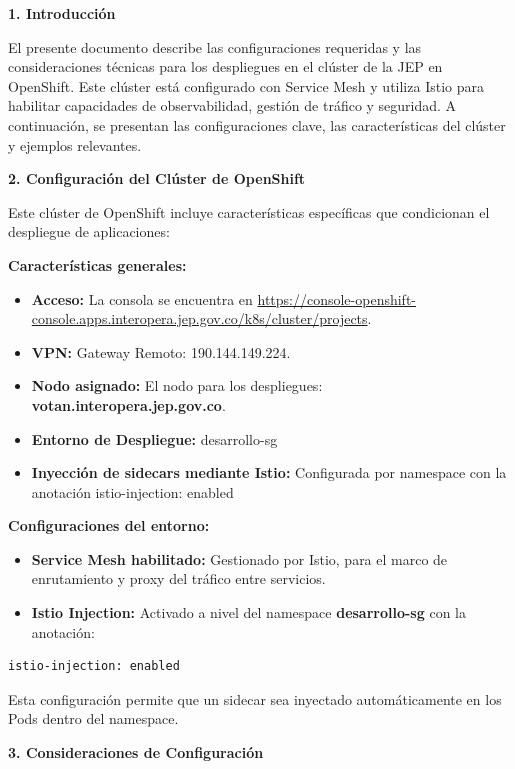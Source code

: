 \documentclass[
  paper=a4,
  ,captions=tableheading
]{scrartcl}
\providecommand{\tightlist}{%
  \setlength{\itemsep}{0pt}\setlength{\parskip}{0pt}}
\begin{document}
\textbf{1. Introducción}

El presente documento describe las configuraciones requeridas y las
consideraciones técnicas para los despliegues en el clúster de la JEP en
OpenShift. Este clúster está configurado con Service Mesh y utiliza
Istio para habilitar capacidades de observabilidad, gestión de tráfico y
seguridad. A continuación, se presentan las configuraciones clave, las
características del clúster y ejemplos relevantes.

\textbf{2. Configuración del Clúster de OpenShift}

Este clúster de OpenShift incluye características específicas que
condicionan el despliegue de aplicaciones:

\textbf{Características generales:}

\begin{itemize}
\tightlist
\item
  \textbf{Acceso:} La consola se encuentra en
  \url{https://console-openshift-console.apps.interopera.jep.gov.co/k8s/cluster/projects}.
\item
  \textbf{VPN:} Gateway Remoto: 190.144.149.224.
\item
  \textbf{Nodo asignado:} El nodo para los despliegues:
  \textbf{votan.interopera.jep.gov.co}.
\item
  \textbf{Entorno de Despliegue:} desarrollo-sg
\item
  \textbf{Inyección de sidecars mediante Istio:} Configurada por
  namespace con la anotación istio-injection: enabled
\end{itemize}

\textbf{Configuraciones del entorno:}

\begin{itemize}
\tightlist
\item
  \textbf{Service Mesh habilitado:} Gestionado por Istio, para el marco
  de enrutamiento y proxy del tráfico entre servicios.
\item
  \textbf{Istio Injection:} Activado a nivel del namespace
  \textbf{desarrollo-sg} con la anotación:
\end{itemize}

\begin{verbatim}
istio-injection: enabled
\end{verbatim}

Esta configuración permite que un sidecar sea inyectado automáticamente
en los Pods dentro del namespace.

\textbf{3. Consideraciones de Configuración}
\end{document}
